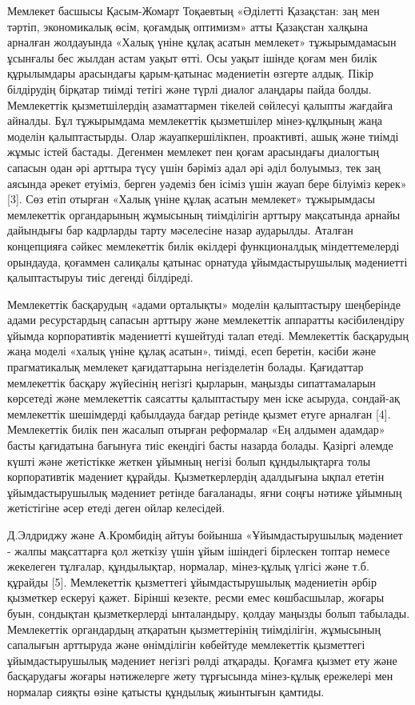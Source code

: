 \begin{multicols}{2}
Мемлекет басшысы Қасым-Жомарт Тоқаевтың «Әділетті Қазақстан: заң мен
тәртіп, экономикалық өсім, қоғамдық оптимизм» атты Қазақстан халқына
арналған жолдауында «Халық үніне құлақ асатын мемлекет» тұжырымдамасын
ұсынғалы бес жылдан астам уақыт өтті. Осы уақыт ішінде қоғам мен билік
құрылымдары арасындағы қарым-қатынас мәдениетін өзгерте алдық. Пікір
білдірудің бірқатар тиімді тетігі және түрлі диалог алаңдары пайда
болды. Мемлекеттік қызметшілердің азаматтармен тікелей сөйлесуі қалыпты
жағдайға айналды. Бұл тұжырымдама мемлекеттік қызметшілер мінез-құлқының
жаңа моделін қалыптастырды. Олар жауапкершілікпен, проактивті, ашық және
тиімді жұмыс істей бастады. Дегенмен мемлекет пен қоғам арасындағы
диалогтың сапасын одан әрі арттыра түсу үшін бәріміз адал әрі әділ
болуымыз, тек заң аясында әрекет етуіміз, берген уәдеміз бен ісіміз үшін
жауап бере білуіміз керек» {[}3{]}. Сөз етіп отырған «Халық үніне құлақ
асатын мемлекет» тұжырымдасы мемлекеттік органдарының жұмысының
тиімділігін арттыру мақсатында арнайы дайындығы бар кадрларды тарту
мәселесіне назар аударылды. Аталған концепцияға сәйкес мемлекеттік билік
өкілдері функционалдық міндеттемелерді орындауда, қоғаммен салиқалы
қатынас орнатуда ұйымдастырушылық мәдениетті қалыптастыруы тиіс дегенді
білдіреді.

Мемлекеттік басқарудың «адами орталықты» моделін қалыптастыру шеңберінде
адами ресурстардың сапасын арттыру және мемлекеттік аппаратты
кәсібилендіру ұйымда корпоративтік мәдениетті күшейтуді талап етеді.
Мемлекеттік басқарудың жаңа моделі «халық үніне құлақ асатын», тиімді,
есеп беретін, кәсіби және прагматикалық мемлекет қағидаттарына
негізделетін болады. Қағидаттар мемлекеттік басқару жүйесінің негізгі
қырларын, маңызды сипаттамаларын көрсетеді және мемлекеттік саясатты
қалыптастыру мен іске асыруда, сондай-ақ мемлекеттік шешімдерді
қабылдауда бағдар ретінде қызмет етуге арналған {[}4{]}. Мемлекеттік
билік пен жасалып отырған реформалар «Ең алдымен адамдар» басты
қағидатына бағынуға тиіс екендігі басты назарда болады. Қазіргі әлемде
күшті және жетістікке жеткен ұйымның негізі болып құндылықтарға толы
корпоративтік мәдениет құрайды. Қызметкерлердің адалдығына ықпал ететін
ұйымдастырушылық мәдениет ретінде бағаланады, яғни соңғы нәтиже ұйымның
жетістігіне әсер етеді деген ойлар келесідей.

Д.Элдриджу және А.Кромбидің айтуы бойынша «Ұйымдастырушылық мәдениет -
жалпы мақсаттарға қол жеткізу үшін ұйым ішіндегі бірлескен топтар немесе
жекелеген тұлғалар, құндылықтар, нормалар, мінез-құлық үлгісі және т.б.
құрайды {[}5{]}. Мемлекеттік қызметтегі ұйымдастырушылық мәдениетін
әрбір қызметкер ескеруі қажет. Бірінші кезекте, ресми емес көшбасшылар,
жоғары буын, сондықтан қызметкерлерді ынталандыру, қолдау маңызды болып
табылады. Мемлекеттік органдардың атқаратын қызметтерінің тиімділігін,
жұмысының сапалығын арттыруда және өнімділігін көбейтуде мемлекеттік
қызметтегі ұйымдастырушылық мәдениет негізгі рөлді атқарады. Қоғамға
қызмет ету және басқарудағы жоғары нәтижелерге жету тұрғысында
мінез-құлық ережелері мен нормалар сияқты өзіне қатысты құндылық
жиынтығын қамтиды.


\end{multicols}
